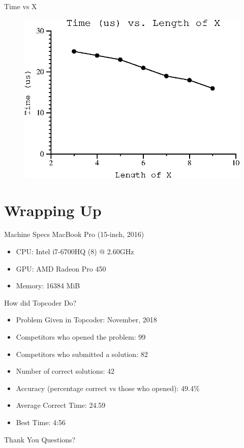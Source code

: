 \documentclass[10pt]{beamer}
\begin{document}
\begin{frame}{Time vs X}
  \begin{figure}[ht!]
    \centering
    \includegraphics[width=1.0\textwidth]{../figures/vary_x.ps}
  \end{figure}
\end{frame}

\section{Wrapping Up}

\begin{frame}{Machine Specs}
  \Large
  MacBook Pro (15-inch, 2016)
  \begin{itemize} %
    \item CPU\@: Intel i7\@-6700HQ (8) @ 2.60GHz
    \item GPU\@: AMD Radeon Pro 450
    \item Memory: 16384 MiB
  \end{itemize}

\end{frame}

\begin{frame}{How did Topcoder Do?}
  \large
  \begin{itemize}
    \item Problem Given in Topcoder: November, 2018
    \item Competitors who opened the problem: 99
    \item Competitors who submitted a solution: 82
    \item Number of correct solutions: 42
    \item Accuracy (percentage correct vs those who opened): 49.4\%
    \item Average Correct Time: 24.59
    \item Best Time: 4:56
  \end{itemize}
\end{frame}

\begin{frame}{Thank You}
  \Huge Questions?
\end{frame}
\end{document}
